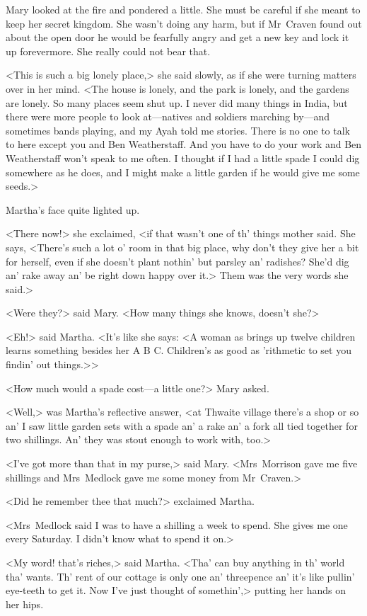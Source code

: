 Mary looked at the fire and pondered a little. She must be careful if she meant to keep her secret kingdom. She wasn't doing any harm, but if Mr~Craven found out about the open door he would be fearfully angry and get a new key and lock it up forevermore. She really could not bear that.

<This is such a big lonely place,> she said slowly, as if she were turning matters over in her mind. <The house is lonely, and the park is lonely, and the gardens are lonely. So many places seem shut up. I never did many things in India, but there were more people to look at—natives and soldiers marching by—and sometimes bands playing, and my Ayah told me stories. There is no one to talk to here except you and Ben Weatherstaff. And you have to do your work and Ben Weatherstaff won't speak to me often. I thought if I had a little spade I could dig somewhere as he does, and I might make a little garden if he would give me some seeds.>

Martha's face quite lighted up.

<There now!> she exclaimed, <if that wasn't one of th' things mother said. She says, <There's such a lot o' room in that big place, why don't they give her a bit for herself, even if she doesn't plant nothin' but parsley an' radishes? She'd dig an' rake away an' be right down happy over it.> Them was the very words she said.>

<Were they?> said Mary. <How many things she knows, doesn't she?>

<Eh!> said Martha. <It's like she says: <A woman as brings up twelve children learns something besides her A B C\@. Children's as good as 'rithmetic to set you findin' out things.>>

<How much would a spade cost—a little one?> Mary asked.

<Well,> was Martha's reflective answer, <at Thwaite village there's a shop or so an' I saw little garden sets with a spade an' a rake an' a fork all tied together for two shillings. An' they was stout enough to work with, too.>

<I've got more than that in my purse,> said Mary. <Mrs~Morrison gave me five shillings and Mrs~Medlock gave me some money from Mr~Craven.>

<Did he remember thee that much?> exclaimed Martha.

<Mrs~Medlock said I was to have a shilling a week to spend. She gives me one every Saturday. I didn't know what to spend it on.>

<My word! that's riches,> said Martha. <Tha' can buy anything in th' world tha' wants. Th' rent of our cottage is only one an' threepence an' it's like pullin' eye-teeth to get it. Now I've just thought of somethin',> putting her hands on her hips.

